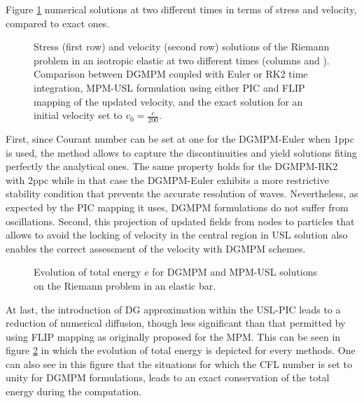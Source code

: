 Figure \ref{fig:elastic_stress} numerical solutions at two different times in terms of stress and velocity, compared to exact ones. 
\begin{figure}[h!]
  \centering
  { \label{subfig:rp_elastic1}}
  { \label{subfig:rp_elastic2}}
  
  \caption{Stress (first row) and velocity (second row) solutions of the Riemann problem in an isotropic elastic at two different times (columns  and ). Comparison between DGMPM coupled with Euler or RK2 time integration, MPM-USL formulation using either PIC and FLIP mapping of the updated velocity, and the exact solution for an initial velocity set to $v_0=\frac{c}{200}$.}
  \label{fig:elastic_stress}
\end{figure}
First, since Courant number can be set at one for the DGMPM-Euler when 1ppc is used, the method allows to capture the discontinuities and yield solutions fiting perfectly the analytical ones. The same property holds for the DGMPM-RK2 with 2ppc while in that case the DGMPM-Euler exhibits a more restrictive stability condition that prevents the accurate resolution of waves. Nevertheless, as expected by the PIC mapping it uses, DGMPM formulations do not suffer from oscillations. 
Second, this projection of updated fields from nodes to particles that allows to avoid the locking of velocity in the central region in USL solution also enables the correct assessment of the velocity with DGMPM schemes.
\begin{figure}[h!]
  \centering
  
  \caption{Evolution of total energy $e$ for DGMPM and MPM-USL solutions on the Riemann problem in an elastic bar.}
  \label{fig:energy_elastic_RP}
\end{figure}
At last, the introduction of DG approximation within the USL-PIC leads to a reduction of numerical diffusion, though less significant than that permitted by using FLIP mapping as originally proposed for the MPM. This can be seen in figure \ref{fig:energy_elastic_RP} in which the evolution of total energy is depicted for every methods.
One can also see in this figure that the situations for which the CFL number is set to unity for DGMPM formulations, leads to an exact conservation of the total energy during the computation.
